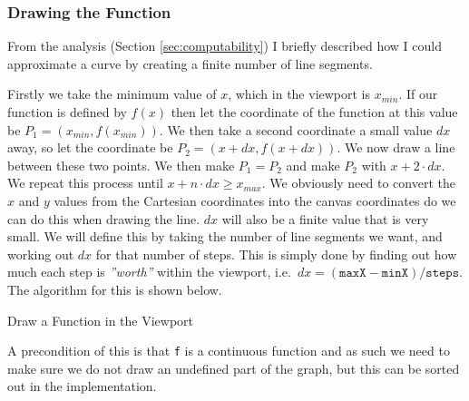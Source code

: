\documentclass[../../../../../../main.tex]{subfiles}
\begin{document}
\subsubsection{Drawing the Function}
From the analysis (Section \ref{sec:computability}) I briefly described how I could approximate a curve by creating a finite number of line segments.

Firstly we take the minimum value of $x$, which in the viewport is $x_{min}$. If our function is defined by $f(x)$ then let the coordinate of the function at this value be $P_1 = (x_{min},f(x_{min}))$. We then take a second coordinate a small value $dx$ away, so let the coordinate be $P_2 = (x+dx,f(x+dx))$. We now draw a line between these two points. We then make $P_1 = P_2$ and make $P_2$ with $x+2\cdot dx$. We repeat this process until $x+n\cdot dx \geq x_{max}$. We obviously need to convert the $x$ and $y$ values from the Cartesian coordinates into the canvas coordinates do we can do this when drawing the line. $dx$ will also be a finite value that is very small. We will define this by taking the number of line segments we want, and working out $dx$ for that number of steps. This is simply done by finding out how much each step is \textit{''worth''} within the viewport, i.e.\ $dx = (\texttt{maxX} - \texttt{minX})/\texttt{steps}$. The algorithm for this is shown below.

\begin{algorithm}
\DontPrintSemicolon
\caption{Draw a Function in the Viewport}
\label{alg:drawFunc}
\end{algorithm}

A precondition of this is that \texttt{f} is a continuous function and as such we need to make sure we do not draw an undefined part of the graph, but this can be sorted out in the implementation.
\end{document}
